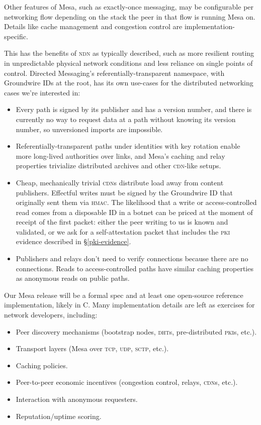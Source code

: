 \documentclass[twoside]{article}
\begin{document}
Other features of Mesa, such as exactly-once messaging, may be
configurable per networking flow depending on the stack the peer in that
flow is running Mesa on. Details like cache management and congestion
control are implementation-specific.

This has the benefits of \textsc{ndn} as typically described, such as more
resilient routing in unpredictable physical network conditions and less
reliance on single points of control. Directed Messaging's
referentially-transparent namespace, with Groundwire IDs at the root,
has its own use-cases for the distributed networking cases we're
interested in:

\begin{itemize}[noitemsep,topsep=2pt]

\item
  Every path is signed by its publisher and has a version number, and
  there is currently no way to request data at a path without knowing
  its version number, so unversioned imports are impossible.
\item
  Referentially-transparent paths under identities with key rotation
  enable more long-lived authorities over links, and Mesa's caching and
  relay properties trivialize distributed archives and other \textsc{cdn}-like
  setups.
\item
  Cheap, mechanically trivial \textsc{cdn}s distribute load away from
  content publishers. Effectful writes must be signed by the
  Groundwire ID that originally sent them via \textsc{hmac}. The likelihood that
  a write or access-controlled read comes from a disposable ID in a botnet can be priced at the
  moment of receipt of the first packet: either the peer writing to us
  is known and validated, or we ask for a self-attestation packet that
  includes the \textsc{pki} evidence described in \S\ref{pki-evidence}.
\item
  Publishers and relays don't need to verify connections because there
  are no connections. Reads to access-controlled paths have similar
  caching properties as anonymous reads on public paths.
\end{itemize}

Our Mesa release will be a formal spec and at least one open-source
reference implementation, likely in C. Many implementation details are
left as exercises for network developers, including:

\begin{itemize}[noitemsep,topsep=2pt]

\item
  Peer discovery mechanisms (bootstrap nodes, \textsc{dht}s, pre-distributed
  \textsc{pki}s, etc.).
\item
  Transport layers (Mesa over \textsc{tcp}, \textsc{udp}, \textsc{sctp}, etc.).
\item
  Caching policies.
\item
  Peer-to-peer economic incentives (congestion control, relays, \textsc{cdn}s, etc.).
\item
  Interaction with anonymous requesters.
\item
  Reputation/uptime scoring.
\end{itemize}
\end{document}
